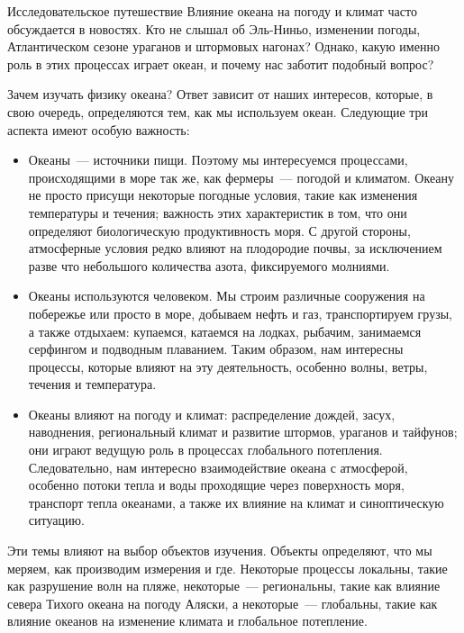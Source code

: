 
\begin{chapter}{Исследовательское путешествие}
Влияние океана на погоду и климат часто обсуждается в новостях. Кто не слышал 
об Эль-Ниньо, изменении погоды, Атлантическом сезоне ураганов и штормовых 
нагонах? Однако, какую именно роль в этих процессах играет океан, и почему 
нас заботит подобный вопрос?

\begin{section}{Зачем изучать физику океана?}
Ответ зависит от наших интересов, которые, в свою очередь, определяются тем,
как мы используем океан. Следующие три аспекта имеют особую важность:

\begin{itemize}
\item 
Океаны~--- источники пищи. Поэтому мы интересуемся процессами, происходящими 
в море так же, как фермеры~--- погодой и климатом. Океану не просто присущи 
некоторые погодные условия, такие как изменения температуры и течения; 
важность этих характеристик в том, что они определяют биологическую 
продуктивность моря. С другой стороны, атмосферные условия редко влияют 
на плодородие почвы, за исключением разве что небольшого количества азота, 
фиксируемого молниями.

\item
Океаны используются человеком. Мы строим различные сооружения на побережье 
или просто в море, добываем нефть и газ, транспортируем грузы, а также 
отдыхаем: купаемся, катаемся на лодках, рыбачим, занимаемся серфингом 
и подводным плаванием. Таким образом, нам интересны процессы, которые 
влияют на эту деятельность, особенно волны, ветры, течения и температура.

\item
Океаны влияют на погоду и климат: распределение дождей, засух, 
наводнения, региональный климат и развитие штормов, ураганов и тайфунов; 
они играют ведущую роль в процессах глобального потепления. 
Следовательно, нам интересно взаимодействие океана с атмосферой, 
особенно потоки тепла и воды проходящие через поверхность моря, 
транспорт тепла океанами, а также их влияние на климат и синоптическую 
ситуацию.
\end{itemize}

Эти темы влияют на выбор объектов изучения. Объекты определяют, что мы меряем, 
как производим измерения и где. Некоторые процессы локальны, такие как 
разрушение волн на пляже, некоторые~--- региональны, такие как влияние севера 
Тихого океана на погоду Аляски, а некоторые~--- глобальны, такие как влияние 
океанов на изменение климата и глобальное потепление. 


\end{section}
\end{chapter}
